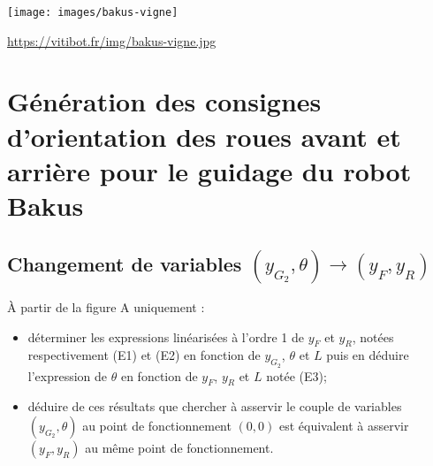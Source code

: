 \documentclass[11pt]{article}
\begin{document}
\UPSTIpreambuleEpreuve	%




\begin{center}
\texttt{[image: images/bakus-vigne]}

\footnotesize \url{https://vitibot.fr/img/bakus-vigne.jpg}
\normalsize
\end{center}
\section{Génération des consignes d'orientation des roues avant et arrière pour le guidage du robot Bakus}


\subsection{Changement de variables $\left (y_{G_2},\theta \right) \rightarrow \left(y_F,y_R\right)$}




\UPSTIquestion* À partir de la figure A uniquement : 
\begin{itemize}
\item déterminer les expressions linéarisées à l'ordre 1 de $y_F$ et $y_R$, notées respectivement (E1) et (E2) en fonction de $y_{G_2}$, $\theta$ et $L$ puis en déduire l'expression de $\theta$ en fonction de $y_F$, $y_R$ et $L$ notée (E3);
\item déduire de ces résultats que chercher à asservir le couple de variables $\left (y_{G_2},\theta \right)$ au point de fonctionnement $\left(0,0\right)$  est équivalent à asservir $\left(y_F,y_R\right)$ au même point de fonctionnement.
\end{itemize}
\end{document}

